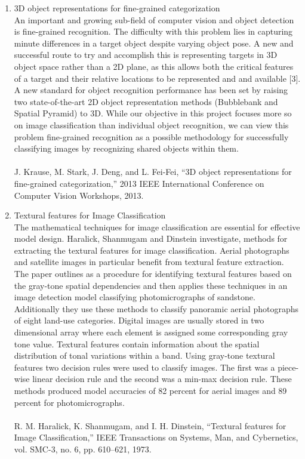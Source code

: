 \documentclass{article}
\begin{document}
\begin{enumerate}
    \item 3D object representations for fine-grained categorization \\
    
    An important and growing sub-field of computer vision and object detection is fine-grained recognition. The difficulty with this problem lies in capturing minute differences in a target object despite varying object pose. A new and successful route to try and accomplish this is representing targets in 3D object space rather than a 2D plane, as this allows both the critical features of a target and their relative locations to be represented and and available [3]. A new standard for object recognition performance has been set by raising two state-of-the-art 2D object representation methods (Bubblebank and Spatial Pyramid) to 3D. While our objective in this project focuses more so on image classification than individual object recognition, we can view this problem fine-grained recognition as a possible methodology for successfully classifying images by recognizing shared objects within them.\\
    \\
        J. Krause, M. Stark, J. Deng, and L. Fei-Fei, “3D object representations for fine-grained categorization,” 2013 IEEE International Conference on Computer Vision Workshops, 2013. \\
        
    \item Textural features for Image Classification \\
        
    The mathematical techniques for image classification are essential for effective model design. Haralick, Shanmugam and Dinstein investigate, methods for extracting the textural features for image classification. Aerial photographs and satellite images in particular benefit from textural feature extraction. The paper outlines as a procedure for identifying textural features based on the gray-tone spatial dependencies and then applies these techniques in an image detection model classifying photomicrographs of sandstone. Additionally they use these methods to classify panoramic aerial photographs of eight land-use categories. Digital images are usually stored in two dimensional array where each element is assigned some corresponding gray tone value. Textural features contain information about the spatial distribution of tonal variations within a band. Using gray-tone textural features two decision rules were used to classify images. The first was a piece-wise linear decision rule and the second was a min-max decision rule. These methods produced model accuracies of 82 percent for aerial images and 89 percent for photomicrographs.  \\
    \\
    R. M. Haralick, K. Shanmugam, and I. H. Dinstein, “Textural features for Image Classification,” IEEE Transactions on Systems, Man, and Cybernetics, vol. SMC-3, no. 6, pp. 610–621, 1973. \\
        
 
\end{enumerate}
\end{document}

